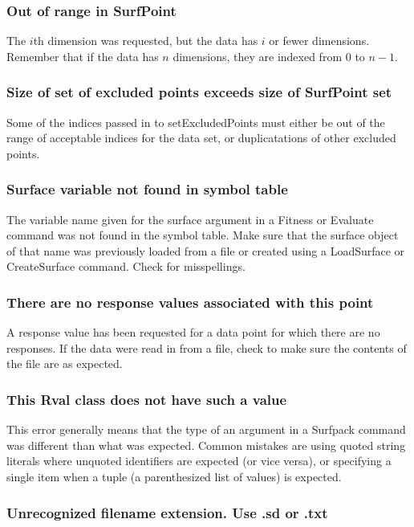\documentclass{article}
\begin{document}
\subsubsection{Out of range in SurfPoint}
The $i$th dimension was requested, but the data has $i$ or fewer dimensions.
Remember that if the data has $n$ dimensions, they are indexed from 0 to $n-1$.

\subsubsection{Size of set of excluded points exceeds size of SurfPoint set}
Some of the indices passed in to setExcludedPoints must either be out of the
range of acceptable indices for the data set, or duplicatations of other
excluded points.

\subsubsection{Surface variable not found in symbol table}
The variable name given for the surface argument in a Fitness or Evaluate
command was not found in the symbol table.  Make sure that the surface object of
that name was previously loaded from a file or created using a LoadSurface or
CreateSurface command.  Check for misspellings.
\subsubsection{There are no response values associated with this point}
A response value has been requested for a data point for which there are no
responses.  If the data were read in from a file, check to make sure the
contents of the file are as expected.

\subsubsection{This Rval class does not have such a value}
This error generally means that the type of an argument in a Surfpack command
was different than what was expected.  Common mistakes are using quoted string
literals where unquoted identifiers are expected (or vice versa), or specifying
a single item when a tuple (a parenthesized list of values) is expected.

\subsubsection{Unrecognized filename extension.  Use .sd or .txt}
\end{document}
